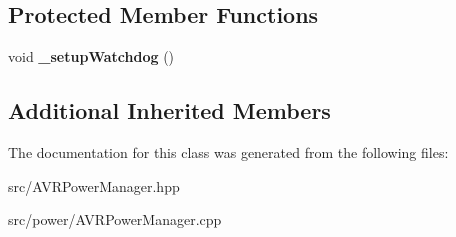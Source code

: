 \subsection*{Protected Member Functions}
\begin{DoxyCompactItemize}
\item 
\mbox{\label{classathome_1_1power_1_1_a_v_r_power_management_ac5410cf1848b98b505afbd6296218ded}} 
void {\bfseries \+\_\+setup\+Watchdog} ()
\end{DoxyCompactItemize}
\subsection*{Additional Inherited Members}


The documentation for this class was generated from the following files\+:\begin{DoxyCompactItemize}
\item 
src/A\+V\+R\+Power\+Manager.\+hpp\item 
src/power/A\+V\+R\+Power\+Manager.\+cpp\end{DoxyCompactItemize}
